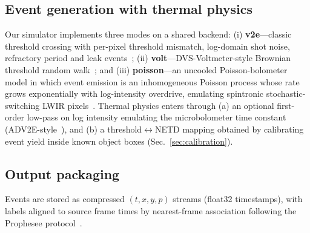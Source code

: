 \subsection{Event generation with thermal physics}
\label{sec:sim}
Our simulator implements three modes on a shared backend:
(i) \textbf{v2e}---classic threshold crossing with per-pixel threshold
mismatch, log-domain shot noise, refractory period and leak
events~\cite{hu2021v2e}; (ii) \textbf{volt}---DVS-Voltmeter-style Brownian
threshold random walk~\cite{lin2022voltmeter}; and (iii)
\textbf{poisson}---an uncooled Poisson-bolometer model in which event
emission is an inhomogeneous Poisson process whose rate grows exponentially
with log-intensity overdrive, emulating spintronic stochastic-switching LWIR
pixels~\cite{mousa2026poisson}. Thermal physics enters through (a) an
optional first-order low-pass on log intensity emulating the microbolometer
time constant (ADV2E-style~\cite{jiang2024adv2e}), and (b) a
threshold$\leftrightarrow$NETD mapping obtained by calibrating event yield
inside known object boxes (Sec.~\ref{sec:calibration}).

\subsection{Output packaging}
Events are stored as compressed $(t,x,y,p)$ streams (float32 timestamps),
with labels aligned to source frame times by nearest-frame association
following the Prophesee protocol~\cite{propheseetoolbox}.
